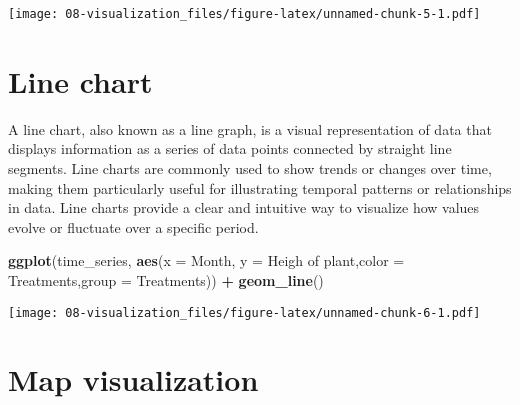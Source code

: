 \documentclass[
]{book}
\newenvironment{Shaded}{\begin{snugshade}}{\end{snugshade}}
\newcommand{\AttributeTok}[1]{\textcolor[rgb]{0.13,0.29,0.53}{#1}}
\newcommand{\FunctionTok}[1]{\textcolor[rgb]{0.13,0.29,0.53}{\textbf{#1}}}
\newcommand{\NormalTok}[1]{#1}
\newcommand{\SpecialCharTok}[1]{\textcolor[rgb]{0.81,0.36,0.00}{\textbf{#1}}}
\newcommand{\StringTok}[1]{\textcolor[rgb]{0.31,0.60,0.02}{#1}}
\begin{document}
\texttt{[image: 08-visualization\_files/figure-latex/unnamed-chunk-5-1.pdf]}

\hypertarget{line-chart}{%
\section{\texorpdfstring{Line chart\\
}{Line chart }}\label{line-chart}}

A line chart, also known as a line graph, is a visual representation of data that displays information as a series of data points connected by straight line segments. Line charts are commonly used to show trends or changes over time, making them particularly useful for illustrating temporal patterns or relationships in data. Line charts provide a clear and intuitive way to visualize how values evolve or fluctuate over a specific period.

\begin{Shaded}
\begin{Highlighting}[]
\FunctionTok{ggplot}\NormalTok{(time\_series, }\FunctionTok{aes}\NormalTok{(}\AttributeTok{x =}\NormalTok{ Month, }\AttributeTok{y =} \StringTok{\textasciigrave{}}\AttributeTok{Heigh of plant}\StringTok{\textasciigrave{}}\NormalTok{,}\AttributeTok{color =}\NormalTok{ Treatments,}\AttributeTok{group =}\NormalTok{ Treatments)) }\SpecialCharTok{+}
  \FunctionTok{geom\_line}\NormalTok{()}
\end{Highlighting}
\end{Shaded}

\texttt{[image: 08-visualization\_files/figure-latex/unnamed-chunk-6-1.pdf]}

\hypertarget{map-visualization}{%
\section{Map visualization}\label{map-visualization}}
\end{document}
